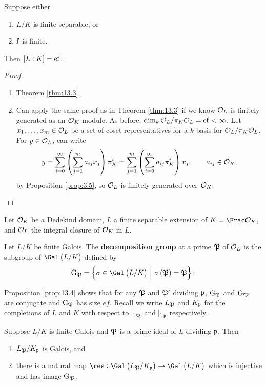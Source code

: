 \begin{corollary}
\label{cor:13.6}
Suppose either
\begin{enumerate}
\item $ L / K $ is finite separable, or
\item $ \mathrm{f} $ is finite.
\end{enumerate}
Then $ \sbr{L : K} = \e\f $.
\end{corollary}

\begin{proof}
\hfill
\begin{enumerate}
\item Theorem \ref{thm:13.3}.
\item Can apply the same proof as in Theorem \ref{thm:13.3} if we know $ \mathcal{O}_L $ is finitely generated as an $ \mathcal{O}_K $-module. As before, $ \dim_k \mathcal{O}_L / \pi_K\mathcal{O}_L = \mathrm{e}\mathrm{f} < \infty $. Let $ x_1, \dots, x_m \in \mathcal{O}_L $ be a set of coset representatives for a $ k $-basis for $ \mathcal{O}_L / \pi_K\mathcal{O}_L $. For $ y \in \mathcal{O}_L $, can write
$$ y = \sum_{i = 0}^\infty \br{\sum_{j = 1}^m a_{ij}x_j}\pi_K^i = \sum_{j = 1}^m \br{\sum_{i = 0}^\infty a_{ij}\pi_K^i}x_j, \qquad a_{ij} \in \OOO_K, $$
by Proposition \ref{prop:3.5}, so $ \mathcal{O}_L $ is finitely generated over $ \mathcal{O}_K $.
\end{enumerate}
\end{proof}

Let $ \mathcal{O}_K $ be a Dedekind domain, $ L $ a finite separable extension of $ K = \Frac \OOO_K $, and $ \mathcal{O}_L $ the integral closure of $ \mathcal{O}_K $ in $ L $.

\begin{definition}
Let $ L / K $ be finite Galois. The \textbf{decomposition group} at a prime $ \mathfrak{P} $ of $ \mathcal{O}_L $ is the subgroup of $ \Gal\br{L / K} $ defined by
$$ \G_\pp = \cbr{\sigma \in \Gal\br{L / K} \st \sigma\br{\pp} = \pp}. $$
\end{definition}

Proposition \ref{prop:13.4} shows that for any $ \mathfrak{P} $ and $ \mathfrak{P}' $ dividing $ \mathfrak{p} $, $ \mathrm{G}_{\mathfrak{P}} $ and $ \mathrm{G}_{\mathfrak{P}'} $ are conjugate and $ \mathrm{G}_{\mathfrak{P}} $ has size $ ef $. Recall we write $ L_{\mathfrak{P}} $ and $ K_{\mathfrak{p}} $ for the completions of $ L $ and $ K $ with respect to $ \abs{\cdot}_{\mathfrak{P}} $ and $ \abs{\cdot}_{\mathfrak{p}} $ respectively.

\begin{proposition}
Suppose $ L / K $ is finite Galois and $ \mathfrak{P} $ is a prime ideal of $ L $ dividing $ \mathfrak{p} $. Then
\begin{enumerate}
\item $ L_{\mathfrak{P}} / K_{\mathfrak{p}} $ is Galois, and
\item there is a natural map $ \res : \Gal\br{L_\pp / K_\ppp} \to \Gal\br{L / K} $ which is injective and has image $ \mathrm{G}_{\mathfrak{P}} $.
\end{enumerate}
\end{proposition}

